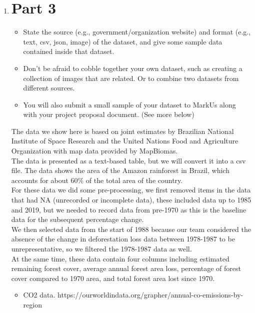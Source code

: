 \documentclass[12pt]{article}
\begin{document}
\begin{enumerate}
\newpage

\item \section*{Part 3}

\begin{itemize}
    \item State the source (e.g., government/organization website) and format (e.g., text, csv, json, image) of the dataset, and give some sample data contained inside that dataset.
    \item Don’t be afraid to cobble together your own dataset, such as creating a collection of images that are related. Or to combine two datasets from different sources.
    \item You will also submit a small sample of your dataset to MarkUs along with your project proposal document. (See more below)
\end{itemize}


The data we show here is based on joint estimates by Brazilian National Institute of Space Research and the United Nations Food and Agriculture Organization with map data provided by MapBiomas.\\
    The data is presented as a text-based table, but we will convert it into a csv file. The data shows the area of the Amazon rainforest in Brazil, which accounts for about 60\% of the total area of the country.\\
    For these data we did some pre-processing, we first removed items in the data that had NA (unrecorded or incomplete data), these included data up to 1985 and 2019, but we needed to record data from pre-1970 as this is the baseline data for the subsequent percentage change.\\
    We then selected data from the start of 1988 because our team considered the absence of the change in deforestation loss data between 1978-1987 to be unrepresentative, so we filtered the 1978-1987 data as well.\\
    At the same time, these data contain four columns including estimated remaining forest cover, average annual forest area loss, percentage of forest cover compared to 1970 area, and total forest area lost since 1970.\\
    
\begin{itemize}
  \item 
  {
    CO2 data.  https://ourworldindata.org/grapher/annual-co-emissions-by-region

}
\end{itemize}
\end{enumerate}
\end{document}
